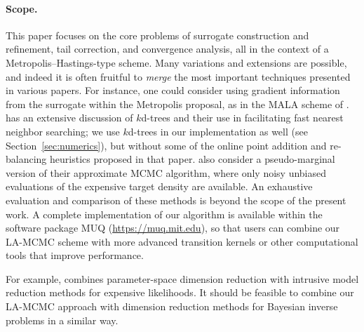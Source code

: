 {\paragraph{Scope.}
This paper focuses on the core problems of surrogate construction and refinement, tail correction, and convergence analysis, all in the context of a Metropolis--Hastings-type scheme. Many variations and extensions are possible, and indeed it is often fruitful to \emph{merge} the most important techniques presented in various papers. For instance, one could consider using gradient information from the surrogate within the Metropolis proposal, as in the MALA scheme of \citet{Conradetal2018}. \citet{doi:10.1080/10618600.2016.1231064} has an extensive discussion of $k$d-trees and their use in facilitating fast nearest neighbor searching; we use $k$d-trees in our implementation as well (see Section~\ref{sec:numerics}), but without some of the online point addition and re-balancing heuristics proposed in that paper. \citet{doi:10.1080/10618600.2016.1231064} also consider a pseudo-marginal version of their approximate MCMC algorithm, where only noisy unbiased evaluations of the expensive target density are available. An exhaustive evaluation and comparison of these methods is beyond the scope of the present work. A complete implementation of our algorithm is available within the software package MUQ (\url{https://muq.mit.edu}), so that users can combine our LA-MCMC scheme with more advanced transition kernels or other computational tools that improve performance. 

 For example, \citet{Cui2016etal} combines parameter-space dimension reduction with intrusive model reduction methods for expensive likelihoods. It should be feasible to combine our LA-MCMC approach with dimension reduction methods for Bayesian inverse problems \citep{cui2014likelihood,constantine2016accelerating,zahm2018certified} in a similar way.

}

